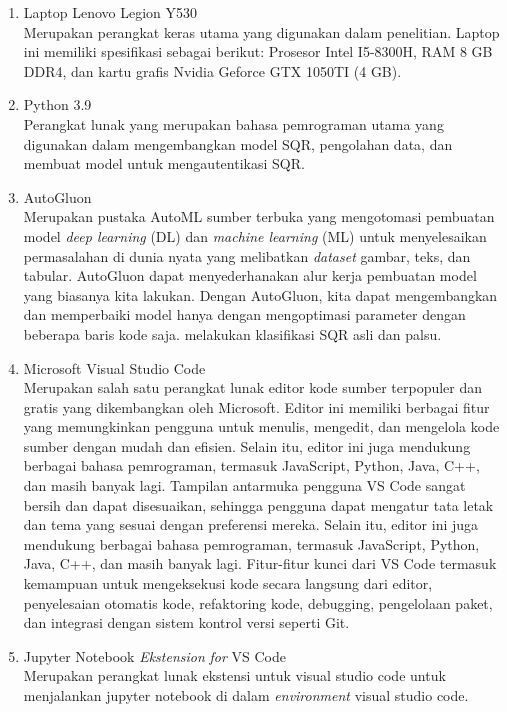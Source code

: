 \begin{enumerate}
	\item Laptop Lenovo Legion Y530\\Merupakan perangkat keras utama yang digunakan dalam penelitian. Laptop ini memiliki spesifikasi sebagai berikut: Prosesor Intel
	      I5-8300H, RAM 8 GB DDR4, dan kartu grafis Nvidia Geforce GTX 1050TI (4 GB).
	\item Python 3.9\\Perangkat lunak yang merupakan bahasa pemrograman utama yang digunakan dalam mengembangkan model SQR, pengolahan data, dan membuat model untuk
	      mengautentikasi SQR.
	\item AutoGluon\\Merupakan pustaka AutoML sumber terbuka yang mengotomasi pembuatan model \emph{deep learning} (DL) dan \emph{machine learning} (ML) untuk
	      menyelesaikan permasalahan di dunia nyata yang melibatkan \emph{dataset} gambar, teks, dan tabular. AutoGluon dapat menyederhanakan alur kerja pembuatan model
	      yang biasanya kita lakukan. Dengan AutoGluon, kita dapat mengembangkan dan memperbaiki model hanya dengan mengoptimasi parameter dengan beberapa baris kode
	      saja. melakukan klasifikasi SQR asli dan palsu.
	\item Microsoft Visual Studio Code\\Merupakan salah satu perangkat lunak editor kode sumber terpopuler dan gratis yang dikembangkan oleh Microsoft. Editor ini
	      memiliki berbagai fitur yang memungkinkan pengguna untuk menulis, mengedit, dan mengelola kode sumber dengan mudah dan efisien. Selain itu, editor ini juga
	      mendukung berbagai bahasa pemrograman, termasuk JavaScript, Python, Java, C++, dan masih banyak lagi. Tampilan antarmuka pengguna VS Code sangat bersih dan
	      dapat disesuaikan, sehingga pengguna dapat mengatur tata letak dan tema yang sesuai dengan preferensi mereka. Selain itu, editor ini juga mendukung berbagai
	      bahasa pemrograman, termasuk JavaScript, Python, Java, C++, dan masih banyak lagi. Fitur-fitur kunci dari VS Code termasuk kemampuan untuk mengeksekusi kode
	      secara langsung dari editor, penyelesaian otomatis kode, refaktoring kode, debugging, pengelolaan paket, dan integrasi dengan sistem kontrol versi seperti Git.
	\item Jupyter Notebook \emph{Ekstension} \emph{for} VS Code\\Merupakan perangkat lunak ekstensi untuk visual studio code untuk menjalankan jupyter notebook di dalam
	      \emph{environment} visual studio code.

\end{enumerate}
